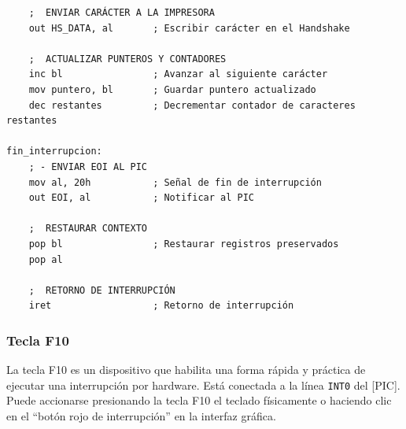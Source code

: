 \documentclass[12pt,oneside]{templates/unerthesis}
\begin{document}
\begin{lstlisting}
    ;  ENVIAR CARÁCTER A LA IMPRESORA 
    out HS_DATA, al       ; Escribir carácter en el Handshake

    ;  ACTUALIZAR PUNTEROS Y CONTADORES 
    inc bl                ; Avanzar al siguiente carácter
    mov puntero, bl       ; Guardar puntero actualizado
    dec restantes         ; Decrementar contador de caracteres restantes

fin_interrupcion:
    ; - ENVIAR EOI AL PIC 
    mov al, 20h           ; Señal de fin de interrupción
    out EOI, al           ; Notificar al PIC

    ;  RESTAURAR CONTEXTO 
    pop bl                ; Restaurar registros preservados
    pop al

    ;  RETORNO DE INTERRUPCIÓN 
    iret                  ; Retorno de interrupción
\end{lstlisting}

\hypertarget{tecla-f10}{%
\subsubsection{Tecla F10}\label{tecla-f10}}

La tecla F10 es un dispositivo que habilita una forma rápida y práctica de ejecutar una interrupción por hardware. Está conectada a la línea \texttt{INT0} del {[}PIC{]}. Puede accionarse presionando la tecla F10 el teclado físicamente o haciendo clic en el ``botón rojo de interrupción'' en la interfaz gráfica.
\end{document}
